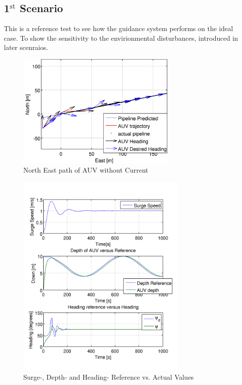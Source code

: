 	\subsection{1$^{\mathrm{st}}$ Scenario}
		This is a reference test to see how the guidance system performs on the ideal case.
		To show the sensitivity to the envirionmental disturbances, introduced in later scenraios.
		\begin{figure}[htbp]
			\centering
			\includegraphics[width=0.7\textwidth]{pics/1st_NE_path}
			\caption{North East path of AUV without Current}
			\label{fig:ch3_1st_NE_path}
		\end{figure}
		\begin{figure}[htbp]
			\centering
			\includegraphics[width=0.75\textwidth]{pics/1st_uDpsi}
			\caption{Surge-, Depth- and Heading- Reference vs. Actual Values}
			\label{fig:ch3_1st_uDpsi}
		\end{figure}
		
